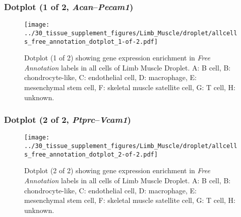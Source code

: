 \clearpage

\subsubsection{Dotplot (1 of 2, \emph{Acan}--\emph{Pecam1})}
\begin{figure}[h]
\centering
\texttt{[image: ../30\_tissue\_supplement\_figures/Limb\_Muscle/droplet/allcells\_free\_annotation\_dotplot\_1-of-2.pdf]}

\caption{ Dotplot (1 of 2)  showing gene expression enrichment in \emph{Free Annotation} labels in all cells of Limb Muscle Droplet. A: B cell, B: chondrocyte-like, C: endothelial cell, D: macrophage, E: mesenchymal stem cell, F: skeletal muscle satellite cell, G: T cell, H: unknown.}
\end{figure}


\clearpage

\subsubsection{Dotplot (2 of 2, \emph{Ptprc}--\emph{Vcam1})}
\begin{figure}[h]
\centering
\texttt{[image: ../30\_tissue\_supplement\_figures/Limb\_Muscle/droplet/allcells\_free\_annotation\_dotplot\_2-of-2.pdf]}

\caption{ Dotplot (2 of 2)  showing gene expression enrichment in \emph{Free Annotation} labels in all cells of Limb Muscle Droplet. A: B cell, B: chondrocyte-like, C: endothelial cell, D: macrophage, E: mesenchymal stem cell, F: skeletal muscle satellite cell, G: T cell, H: unknown.}
\end{figure}

